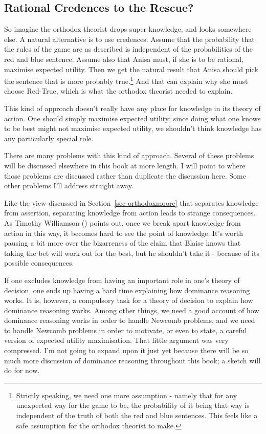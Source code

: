 \documentclass[
  10pt,
  letterpaper,
  twoside]{scrbook}
\begin{document}
\subsection{Rational Credences to the Rescue?}\label{sec-probrescue}

So imagine the orthodox theorist drops super-knowledge, and looks
somewhere else. A natural alternative is to use credences. Assume that
the probability that the rules of the game are as described is
independent of the probabilities of the red and blue sentence. Assume
also that Anisa must, if she is to be rational, maximise expected
utility. Then we get the natural result that Anisa should pick the
sentence that is more probably true.\footnote{Strictly speaking, we need
  one more assumption - namely that for any unexpected way for the game
  to be, the probability of it being that way is independent of the
  truth of both the red and blue sentences. This feels like a safe
  assumption for the orthodox theorist to make.} And that can explain
why she must choose Red-True, which is what the orthodox theorist needed
to explain.

This kind of approach doesn't really have any place for knowledge in its
theory of action. One should simply maximise expected utility; since
doing what one knows to be best might not maximise expected utility, we
shouldn't think knowledge has any particularly special role.

There are many problems with this kind of approach. Several of these
problems will be discussed elsewhere in this book at more length. I will
point to where those problems are discussed rather than duplicate the
discussion here. Some other problems I'll address straight away.

Like the view discussed in Section~\ref{sec-orthodoxmoore} that
separates knowledge from assertion, separating knowledge from action
leads to strange consequences. As Timothy Williamson
() points out, once we break apart
knowledge from action in this way, it becomes hard to see the point of
knowledge. It's worth pausing a bit more over the bizarreness of the
claim that Blaise knows that taking the bet will work out for the best,
but he shouldn't take it - because of its possible consequences.

If one excludes knowledge from having an important role in one's theory
of decision, one ends up having a hard time explaining how dominance
reasoning works. It is, however, a compulsory task for a theory of
decision to explain how dominance reasoning works. Among other things,
we need a good account of how dominance reasoning works in order to
handle Newcomb problems, and we need to handle Newcomb problems in order
to motivate, or even to state, a careful version of expected utility
maximisation. That little argument was very compressed. I'm not going to
expand upon it just yet because there will be so much more discussion of
dominance reasoning throughout this book; a sketch will do for now.
\end{document}
